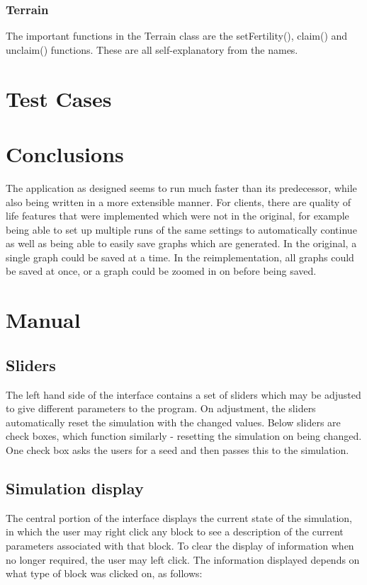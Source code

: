 \documentclass[12pt]{article}
\begin{document}
			\subsubsection{Terrain}
				The important functions in the Terrain class are the setFertility(), claim() and unclaim() functions. These are all self-explanatory from the names.
	
	\section{Test Cases}
		
	\section{Conclusions}
		The application as designed seems to run much faster than its predecessor, while also being written in a more extensible manner. For clients, there are quality of life features that were implemented which were not in the original, for example being able to set up multiple runs of the same settings to automatically continue as well as being able to easily save graphs which are generated. In the original, a single graph could be saved at a time. In the reimplementation, all graphs could be saved at once, or a graph could be zoomed in on before being saved.
	\begin{thebibliography}{9}
		
	\end{thebibliography}

	\appendix
	\section{Manual}
		\subsection{Sliders}
			The left hand side of the interface contains a set of sliders which may be adjusted to give different parameters to the program. On adjustment, the sliders automatically reset the simulation with the changed values. Below sliders are check boxes, which function similarly - resetting the simulation on being changed. One check box asks the users for a seed and then passes this to the simulation.
		
		\subsection{Simulation display}
			The central portion of the interface displays the current state of the simulation, in which the user may right click any block to see a description of the current parameters associated with that block. To clear the display of information when no longer required, the user may left click. The information displayed depends on what type of block was clicked on, as follows:
\end{document}
